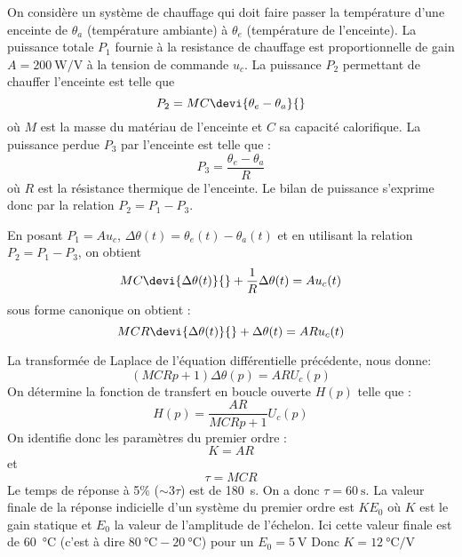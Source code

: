 On considère un système de chauffage qui doit faire passer la température 
d'une enceinte de $\theta_a$  (température ambiante) à $\theta_e$ (température 
de l'enceinte). 
La puissance totale $P_1$ fournie à la resistance de chauffage 
est proportionnelle de gain $A=\SI{200}{\watt\per\volt}$ à la tension de 
commande $u_c$. La puissance $P_2$ permettant de chauffer l'enceinte est 
telle que 
\[
    P_2=MC\devi{\theta_e-\theta_a}{}
\]
où $M$ est la masse du matériau de l'enceinte et $C$ sa capacité calorifique.
La puissance perdue $P_3$ par l'enceinte est telle que :
\[
    P_3=\dfrac{\theta_e-\theta_a}{R}
\]
où $R$ est la résistance thermique de l'enceinte.
Le bilan de puissance s'exprime donc par la relation $P_2=P_1-P_3$.

En posant $P_1=Au_c$, $\Delta\theta(t)=\theta_e(t)-\theta_a(t)$ et en utilisant
la relation $P_2=P_1-P_3$, on obtient 
\[
    MC\devi{\Delta\theta(t)}{}+\dfrac{1}{R}\Delta\theta(t)=Au_c(t)
\]
sous forme canonique on obtient :
\[
    MCR\devi{\Delta\theta(t)}{}+\Delta\theta(t)=ARu_c(t)
\]

La transformée de Laplace de l'équation différentielle précédente, nous donne:
\[
    (MCRp+1)\Delta\theta(p)=AR U_c(p)
\]
On détermine la fonction de transfert en boucle ouverte $H(p)$ telle que :
\[
    H(p)=\dfrac{AR}{MCRp+1} U_c(p)
\]
On identifie donc les paramètres du premier ordre :
\[
    K=AR
\]
et
\[
    \tau=MCR
\]
Le temps de réponse à 5\% ($\sim 3\tau$) est de \SI{180}{\second}. 
On a donc $\tau=\SI{60}{\second}$. 
La valeur finale de la réponse indicielle d'un système du premier ordre est 
$KE_0$ où $K$ est le gain statique et $E_0$ la valeur de l'amplitude de 
l'échelon. Ici cette valeur finale est de \SI{60}{\celsius} (c'est à dire 
$\SI{80}{\celsius} -\SI{20}{\celsius}$) pour un $E_0=\SI{5}{\volt}$
Donc $K=\SI{12}{\celsius\per\volt}$

